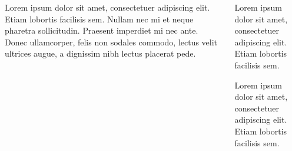 \documentclass{beamer}
\begin{document}
\begin{frame}[plain]
    \begin{columns}
        \begin{column}{5cm}
            \begin{bee}[]
                Lorem ipsum dolor sit amet, consectetuer adipiscing elit.
                Etiam lobortis facilisis sem. Nullam nec mi et neque
                pharetra sollicitudin. Praesent imperdiet mi nec ante. Donec
                ullamcorper, felis non sodales commodo, lectus velit ultrices
                augue, a dignissim nibh lectus placerat pede.
            \end{bee}
        \end{column}
        \begin{column}{5cm}
            \begin{bee}[note 1]
                Lorem ipsum dolor sit amet, consectetuer adipiscing elit.
                Etiam lobortis facilisis sem. 
            \end{bee}
            \begin{bee}[note 2]
                Lorem ipsum dolor sit amet, consectetuer adipiscing elit.
                Etiam lobortis facilisis sem. 
            \end{bee}
        \end{column}
    \end{columns}
\end{frame}
\end{document}
